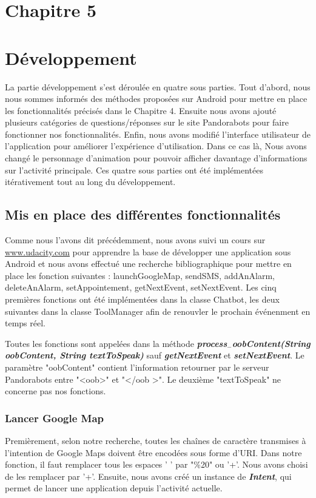 \section*{Chapitre 5}
\section{Développement}
	La partie développement s'est déroulée en quatre sous parties. Tout d'abord, nous nous sommes informés des méthodes proposées sur Android pour mettre en place les fonctionnalités précisés dans le Chapitre 4. Ensuite nous avons ajouté plusieurs catégories de questions/réponses sur le site Pandorabots pour faire fonctionner nos fonctionnalités. Enfin, nous avons modifié l'interface utilisateur de l'application pour améliorer l'expérience d'utilisation. Dans ce cas là, Nous avons changé le personnage d'animation pour pouvoir afficher davantage d'informations sur l'activité principale. Ces quatre sous parties ont été implémentées itérativement tout au long du développement.

\subsection{Mis en place des différentes fonctionnalités}
	
\indent Comme nous l'avons dit précédemment, nous avons suivi un cours sur \url{www.udacity.com} pour apprendre la base de développer une application sous Android et nous avons effectué une recherche bibliographique pour mettre en place les fonction suivantes : launchGoogleMap, sendSMS, addAnAlarm, deleteAnAlarm, setAppointement, getNextEvent, setNextEvent. Les cinq premières fonctions ont été implémentées dans la classe Chatbot, les deux suivantes dans la classe ToolManager afin de renouvler le prochain événenment en temps réel.

\indent Toutes les fonctions sont appelées dans la méthode \textbf{\emph{process$_-$oobContent(String oobContent, String textToSpeak)}} sauf \textbf{\emph{getNextEvent}} et \textbf{\emph{setNextEvent}}. Le paramètre "oobContent" contient l'information retourner par le serveur Pandorabots entre "<oob>" et "</oob >". Le deuxième "textToSpeak" ne concerne pas nos fonctions.

\subsubsection{Lancer Google Map}

\indent Premièrement, selon notre recherche, toutes les chaînes de caractère transmises à l'intention de Google Maps doivent être encodées sous forme d'URI. Dans notre fonction, il faut remplacer tous les espaces ' ' par "\%20" ou '+'. Nous avons choisi de les remplacer par '+'. Ensuite, nous avons créé un instance de \textbf{\emph{Intent}}, qui permet de lancer une application depuis l'activité actuelle. 


